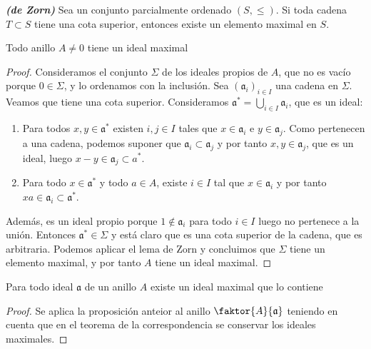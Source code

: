 \documentclass[./main.tex]{subfiles}
\begin{document}
\begin{lemma} \textbf{\emph{(de Zorn)}}
Sea un conjunto parcialmente ordenado $(S,\leq)$. Si toda cadena $T \subset S$ tiene una cota superior, entonces existe un elemento maximal en $S$.
\end{lemma}

\begin{proposition} \label{existe_maximal}
Todo anillo $A \neq 0$ tiene un ideal maximal
\end{proposition}
\begin{proof}
Consideramos el conjunto $\Sigma$ de los ideales propios de $A$, que no es vacío porque $0\in \Sigma$, y lo ordenamos con la inclusión. Sea $(\mathfrak a_i)_{i\in I}$ una cadena en $\Sigma$. Veamos que tiene una cota superior.
Consideramos $\mathfrak a ^* = \bigcup _{i\in I} \mathfrak a_i$, que es un ideal:
\begin{enumerate}
    \item Para todos $x, y \in  \mathfrak a^*$ existen $i, j \in I$ tales que $x\in \mathfrak a_i$ e $y \in \mathfrak a_j$. Como pertenecen a una cadena, podemos suponer que $\mathfrak a_i \subset \mathfrak a_j$ y por tanto $x, y \in \mathfrak a_j$, que es un ideal, luego $x - y \in  \mathfrak a_j \subset a^*$.
    \item Para todo $x\in \mathfrak a^*$ y todo $a \in A$, existe $i\in I$ tal que $x\in \mathfrak a_i$ y por tanto $xa \in \mathfrak a_i \subset \mathfrak a^*$.
\end{enumerate}
Además, es un ideal propio porque $1\not\in \mathfrak a_i$ para todo $i\in I$ luego no pertenece a la unión. Entonces $\mathfrak a^* \in \Sigma$ y está claro que es una cota superior de la cadena, que es arbitraria. Podemos aplicar el lema de Zorn y concluimos que $\Sigma$ tiene un elemento maximal, y por tanto $A$ tiene un ideal maximal.
\end{proof}

\begin{corollary}
Para todo ideal $\mathfrak a$ de un anillo $A$ existe un ideal maximal que lo contiene
\end{corollary}
\begin{proof}
Se aplica la proposición anteior al anillo $\faktor{A}{\mathfrak a}$ teniendo en cuenta que en el teorema de la correspondencia se conservar los ideales maximales.
\end{proof}
\end{document}
